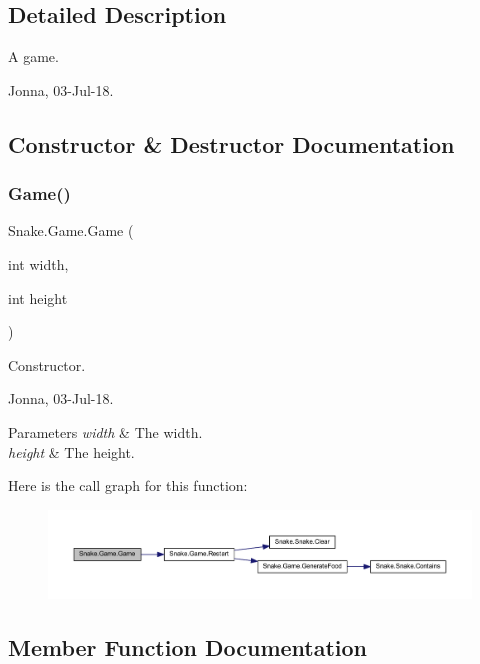 \subsection{Detailed Description}
A game. 

Jonna, 03-\/\+Jul-\/18. 

\subsection{Constructor \& Destructor Documentation}
\mbox{\label{class_snake_1_1_game_a16b91396b858683bbf27177137e660da}} 
\subsubsection{\texorpdfstring{Game()}{Game()}}
{\footnotesize\ttfamily Snake.\+Game.\+Game (\begin{DoxyParamCaption}\item[{int}]{width,  }\item[{int}]{height }\end{DoxyParamCaption})}



Constructor. 

Jonna, 03-\/\+Jul-\/18. 


\begin{DoxyParams}{Parameters}
{\em width} & The width. \\
\hline
{\em height} & The height. \\
\hline
\end{DoxyParams}
Here is the call graph for this function\+:
\nopagebreak
\begin{figure}[H]
\begin{center}
\leavevmode
\includegraphics[width=350pt]{d5/d72/class_snake_1_1_game_a16b91396b858683bbf27177137e660da_cgraph}
\end{center}
\end{figure}


\subsection{Member Function Documentation}
\mbox{\label{class_snake_1_1_game_ab7a178dc4a0dfa1af089aecc944fa209}} 

